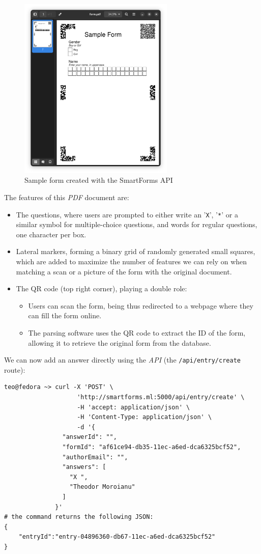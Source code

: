 \documentclass[11pt, a4paper]{report}
\def\code#1{\texttt{#1}}
\begin{document}
\begin{figure}[!h]
    \centering
    \includegraphics[width=20em]{images/screenshoots/sample_form.png}
    \caption{Sample form created with the SmartForms API}
    \label{simple-form-preview}
\end{figure}

The features of this \textit{PDF} document are:
\begin{itemize}
    \item The questions, where users are prompted to either write an '\code{X}', '\code{*}' or a similar symbol for multiple-choice questions, and words for regular questions, one character per box.
    \item Lateral markers, forming a binary grid of randomly generated small squares, which are added to maximize the number of features we can rely on when matching a scan or a picture of the form with the original document.
    \item The QR code (top right corner), playing a double role:
    \begin{itemize}
        \item Users can scan the form, being thus redirected to a webpage where they can fill the form online.
        \item The parsing software uses the QR code to extract the ID of the form, allowing it to retrieve the original form from the database.
    \end{itemize}
\end{itemize}

We can now add an answer directly using the \textit{API} (the \code{/api/entry/create} route):

\begin{verbatim}
teo@fedora ~> curl -X 'POST' \
                    'http://smartforms.ml:5000/api/entry/create' \
                    -H 'accept: application/json' \
                    -H 'Content-Type: application/json' \
                    -d '{
                "answerId": "",
                "formId": "af61ce94-db35-11ec-a6ed-dca6325bcf52",
                "authorEmail": "",
                "answers": [
                  "X ",
                  "Theodor Moroianu"
                ]
              }'
# the command returns the following JSON:
{
    "entryId":"entry-04896360-db67-11ec-a6ed-dca6325bcf52"
}
\end{verbatim}
\end{document}
